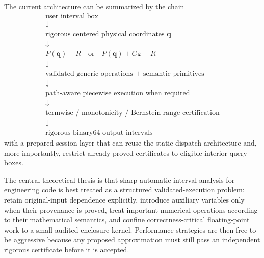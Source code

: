 \documentclass[11pt]{article}
\newcommand{\epsv}{\boldsymbol{\varepsilon}}
\newcommand{\qv}{\mathbf{q}}
\begin{document}
The current architecture can be summarized by the chain
\[
\boxed{
\begin{array}{c}
\text{user interval box}\\
\downarrow\\
\text{rigorous centered physical coordinates }\qv\\
\downarrow\\
P(\qv)+R\quad\text{or}\quad P(\qv)+G\epsv+R\\
\downarrow\\
\text{validated generic operations + semantic primitives}\\
\downarrow\\
\text{path-aware piecewise execution when required}\\
\downarrow\\
\text{termwise / monotonicity / Bernstein range certification}\\
\downarrow\\
\text{rigorous binary64 output intervals}
\end{array}}
\]
with a prepared-session layer that can reuse the static dispatch architecture and,
more importantly, restrict already-proved certificates to eligible interior
query boxes.

The central theoretical thesis is that sharp automatic interval analysis for
engineering code is best treated as a structured validated-execution problem:
retain original-input dependence explicitly, introduce auxiliary variables only
when their provenance is proved, treat important numerical operations according
to their mathematical semantics, and confine correctness-critical floating-point
work to a small audited enclosure kernel.  Performance strategies are then free
to be aggressive because any proposed approximation must still pass an independent
rigorous certificate before it is accepted.
\end{document}
